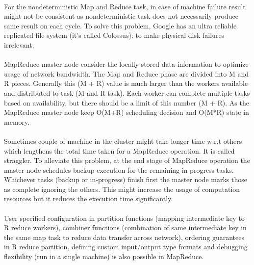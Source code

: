 \documentclass[8pt]{extarticle}
\begin{document}
\paragraph{}
For the nondeterministic Map and Reduce task, in case of machine failure result might not be consistent as nondeterministic task does not necessarily produce same result on each cycle. To solve this problem, Google has an ultra reliable replicated file system (it's called Colossus): to make physical disk failures irrelevant.

\paragraph{}
MapReduce master node consider the locally stored data information to optimize usage of network bandwidth. The Map and Reduce phase are divided into M and R pieces. Generally this (M + R)  value is much larger than the workers available and distributed to task (M and R task). Each worker can complete multiple  tasks based on  availability, but there should be a limit of this number (M + R). As the MapReduce master node keep O(M+R) scheduling decision and O(M*R) state in memory.

\paragraph{}
Sometimes couple of machine in the cluster might take longer time w.r.t others which lengthens the total time taken for a MapReduce operation. It is called straggler. To alleviate this problem, at the end stage of MapReduce operation the master node schedules backup execution for the remaining in-progress tasks. Whichever tasks (backup or in-progress) finish first the master node marks those as complete ignoring the others. This might increase the usage of computation resources but it reduces the execution time significantly.

\paragraph{}
User specified configuration in partition functions (mapping intermediate key to R reduce workers), combiner functions (combination of same intermediate key in the same map task to reduce data transfer across network), ordering guarantees in R reduce partition, defining custom input/output type formats and debugging flexibility (run in a single machine) is also possible in MapReduce.
\end{document}
